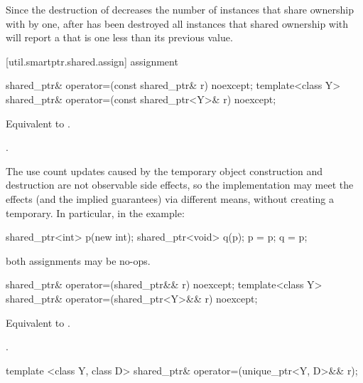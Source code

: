 \pnum
\enternote Since the destruction of 
decreases the number of instances that share ownership with 
by one,
after  has been destroyed
all  instances that shared ownership with
 will report a  that is one less
than its previous value. \exitnote

[util.smartptr.shared.assign]{ assignment}

%
%
\begin{itemdecl}
shared_ptr& operator=(const shared_ptr& r) noexcept;
template<class Y> shared_ptr& operator=(const shared_ptr<Y>& r) noexcept;
\end{itemdecl}

\begin{itemdescr}
\pnum\effects  Equivalent to .

\pnum\returns  {}.

\pnum \enternote
The use count updates caused by the temporary object
construction and destruction are not observable side
effects, so the implementation may meet the effects (and the
implied guarantees) via different means, without creating a
temporary. In particular, in the example:
\begin{codeblock}
shared_ptr<int> p(new int);
shared_ptr<void> q(p);
p = p;
q = p;
\end{codeblock}
both assignments may be no-ops. \exitnote
\end{itemdescr}

%
%
\begin{itemdecl}
shared_ptr& operator=(shared_ptr&& r) noexcept;
template<class Y> shared_ptr& operator=(shared_ptr<Y>&& r) noexcept;
\end{itemdecl}

\begin{itemdescr}
\pnum
\effects Equivalent to .

\pnum
\returns {}.
\end{itemdescr}

%
%
\begin{itemdecl}
template <class Y, class D> shared_ptr& operator=(unique_ptr<Y, D>&& r);
\end{itemdecl}

